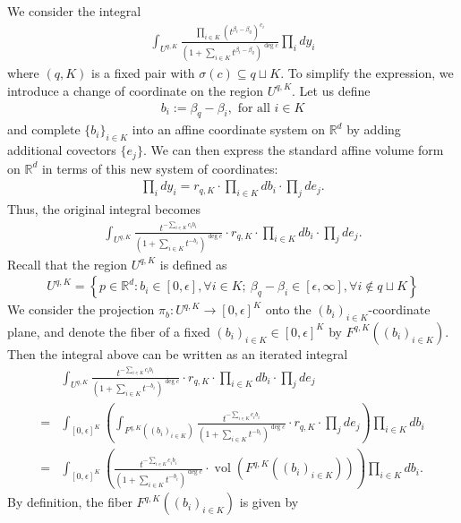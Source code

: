 \documentclass[11pt,reqno]{amsart}
\def\R {{\mathbb R}}
\theoremstyle{definition}
\numberwithin{equation}{section}
\begin{document}
We consider the integral
\begin{align}\label{eq1}
	\int_{U^{q,K}}\frac{\prod_{i\in K}(t^{\beta_i-\beta_q})^{c_i}}{\left(1+\sum_{i\in K}t^{\beta_i-\beta_q}\right)^{\deg c}}\prod_{i}dy_i
\end{align}
where $(q,K)$ is a fixed pair with $\sigma(c)\subseteq q\sqcup K$. To simplify the expression, we introduce a change of coordinate on the region $U^{q,K}$. Let us define
\begin{align*}
	b_i:=\beta_q-\beta_i, \text{ for all }i\in K
\end{align*}
and complete $\{b_i\}_{i\in K}$ into an affine coordinate system on $\R^d$ by adding additional covectors $\{e_j\}$. We can then express the standard affine volume form on $\R^d$ in terms of this new system of coordinates:
\begin{align*}
	\prod_i dy_i= r_{q,K}\cdot\prod_{i\in K}db_i\cdot\prod_{j}de_j .
\end{align*}
Thus, the original integral becomes
\begin{align*}
	\int_{U^{q,K}}\frac{t^{-\sum_{i\in K}c_ib_i}}{\left(1+\sum_{i\in K}t^{-b_i}\right)^{\deg c}}\cdot r_{q,K}\cdot\prod_{i\in K}db_i\cdot\prod_{j}de_j .
\end{align*}
Recall that the region $U^{q,K}$ is defined as 
\begin{align*}
	U^{q,K}=\left\{p\in\R^d:b_i\in[0,\epsilon],\forall i\in K;\ \beta_q-\beta_i\in[\epsilon,\infty],\forall i\not\in q\sqcup K\right\}
\end{align*}
We consider the projection $\pi_b: U^{q,K}\rightarrow [0,\epsilon]^{K}$ onto the $(b_i)_{i\in K}$-coordinate plane, and denote the fiber of a fixed $(b_i)_{i\in K}\in[0,\epsilon]^{K}$ by $F^{q,K}((b_i)_{i\in K})$. Then the integral above can be written as an iterated integral
\begin{align*}
	&\int_{U^{q,K}}\frac{t^{-\sum_{i\in K}c_ib_i}}{\left(1+\sum_{i\in K}t^{-b_i}\right)^{\deg c}}\cdot r_{q,K}\cdot\prod_{i\in K}db_i\cdot\prod_{j}de_j\\
	=&\int_{[0,\epsilon]^K}\left(\int_{F^{q,K}((b_i)_{i\in K})}\frac{t^{-\sum_{i\in K}c_ib_i}}{\left(1+\sum_{i\in K}t^{-b_i}\right)^{\deg c}}\cdot r_{q,K}\cdot\prod_{j}de_j \right)\prod_{i\in K}db_i\\
	=&\int_{[0,\epsilon]^K}\left(\frac{t^{-\sum_{i\in K}c_ib_i}}{\left(1+\sum_{i\in K}t^{-b_i}\right)^{\deg c}}\cdot\operatorname{vol}\left(F^{q,K}((b_i)_{i\in K})\right) \right)\prod_{i\in K}db_i .
\end{align*}
By definition, the fiber $F^{q,K}((b_i)_{i\in K})$ is given by
\end{document}
